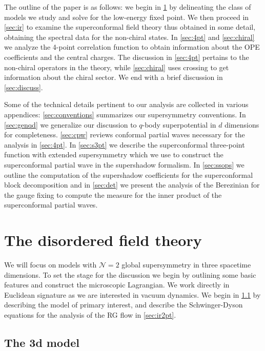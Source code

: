 \documentclass[11pt]{article}
\begin{document}
The outline of the paper is as follows: we begin in \cref{sec:n2qft} by delineating the class of models we study and  solve for the low-energy fixed point. We then proceed in \cref{sec:ir} to examine the superconformal field theory thus obtained in some detail, obtaining the spectral data for the non-chiral states. In \cref{sec:4pt} and \cref{sec:chiral}  we analyze  the 4-point correlation function to obtain information about the OPE coefficients and the central charges. The discussion in \cref{sec:4pt} pertains to the non-chiral operators in the theory, while \cref{sec:chiral} uses crossing to get information about the chiral sector. We end with a brief discussion in \cref{sec:discuss}. 

Some of the technical details pertinent to our analysis are collected in various appendices: \cref{sec:conventions}  summarizes our supersymmetry conventions. In  \cref{sec:genqd}  we generalize our discussion to $q$-body superpotential in $d$ dimensions for completeness. \cref{sec:cpw}
reviews conformal partial waves necessary for the analysis in \cref{sec:4pt}. In \cref{sec:s3pt} we describe the superconformal three-point function with extended supersymmetry which we use to construct the superconformal partial wave in the supershadow formalism. In \cref{sec:ssops}  we outline the computation of the supershadow coefficients for the superconformal block decomposition and in \cref{sec:det} we present the analysis of the Berezinian for the gauge fixing to compute the measure for the inner product of the superconformal partial waves.

\section{The disordered field theory}
\label{sec:n2qft}

We will  focus on models with $\mathcal{N}=2$ global supersymmetry in three spacetime dimensions.
 To set the stage for the discussion we begin by outlining some basic features and construct the microscopic Lagrangian. We work directly in Euclidean signature as we are interested in vacuum dynamics. We begin in \cref{sec:model} by describing the model of primary interest, and  describe the Schwinger-Dyson equations for the analysis of the RG flow in \cref{sec:ir2pt}.  

\subsection{The 3d model}
\label{sec:model}
\end{document}
